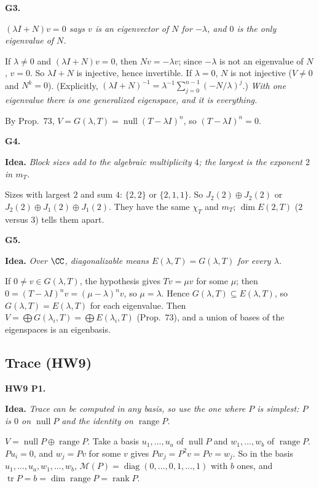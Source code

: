 \documentclass[10pt]{scrartcl}
\DeclareMathOperator{\nul}{null}
\DeclareMathOperator{\range}{range}
\DeclareMathOperator{\tr}{tr}
\newcommand{\MM}{\mathcal M}
\newcommand{\idea}[1]{{\color{OliveGreen!75!black}\textbf{Idea.}} \textit{#1}\par}
\newenvironment{prob}{\par\medskip\noindent\begin{minipage}{\linewidth}\setlength{\parskip}{3pt}}{\end{minipage}\par}
\begin{document}
\begin{prob}
\textbf{G3. }\par 
\begin{enumerate}[(a)]
  \ii \idea{$(\lambda I+N)v=0$ says $v$ is an eigenvector of $N$ for $-\lambda$, and $0$ is the only eigenvalue of $N$.}
  If $\lambda\ne0$ and $(\lambda I+N)v=0$, then $Nv=-\lambda v$; since $-\lambda$ is not an eigenvalue of $N$, $v=0$. So $\lambda I+N$ is injective, hence invertible. If $\lambda=0$, $N$ is not injective ($V\ne0$ and $N^k=0$). (Explicitly, $(\lambda I+N)^{-1}=\lambda^{-1}\sum_{j=0}^{n-1}(-N/\lambda)^j$.)
  \ii \idea{With one eigenvalue there is one generalized eigenspace, and it is everything.}
  By Prop.~73, $V=G(\lambda,T)=\nul(T-\lambda I)^n$, so $(T-\lambda I)^n=0$.
\end{enumerate}
\end{prob}

\begin{prob}
\textbf{G4. }\par 
\idea{Block sizes add to the algebraic multiplicity $4$; the largest is the exponent $2$ in $m_T$.}
Sizes with largest $2$ and sum $4$: $\{2,2\}$ or $\{2,1,1\}$. So $J_2(2)\oplus J_2(2)$ or $J_2(2)\oplus J_1(2)\oplus J_1(2)$. They have the same $\chi_T$ and $m_T$; $\dim E(2,T)$ ($2$ versus $3$) tells them apart.
\end{prob}

\begin{prob}
\textbf{G5. }\par 
\idea{Over $\CC$, diagonalizable means $E(\lambda,T)=G(\lambda,T)$ for every $\lambda$.}
If $0\ne v\in G(\lambda,T)$, the hypothesis gives $Tv=\mu v$ for some $\mu$; then $0=(T-\lambda I)^nv=(\mu-\lambda)^nv$, so $\mu=\lambda$. Hence $G(\lambda,T)\subseteq E(\lambda,T)$, so $G(\lambda,T)=E(\lambda,T)$ for each eigenvalue. Then $V=\bigoplus G(\lambda_i,T)=\bigoplus E(\lambda_i,T)$ (Prop.~73), and a union of bases of the eigenspaces is an eigenbasis.
\end{prob}

\subsection{Trace (HW9)}

\begin{prob}
\textbf{HW9 P1. }\par 
\idea{Trace can be computed in any basis, so use the one where $P$ is simplest: $P$ is $0$ on $\nul P$ and the identity on $\range P$.}$V=\nul P\oplus\range P$. Take a basis $u_1,\dots,u_a$ of $\nul P$ and $w_1,\dots,w_b$ of $\range P$. $Pu_i=0$, and $w_j=Pv$ for some $v$ gives $Pw_j=P^2v=Pv=w_j$. So in the basis $u_1,\dots,u_a,w_1,\dots,w_b$, $\MM(P)=\operatorname{diag}(0,\dots,0,1,\dots,1)$ with $b$ ones, and $\tr P=b=\dim\range P=\operatorname{rank}P$.
\end{prob}
\end{document}
